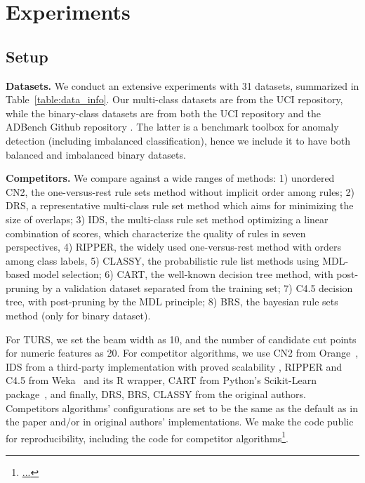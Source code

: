  
\section{Experiments} \label{sec:exp}
\subsection{Setup}
\textbf{Datasets.} We conduct an extensive experiments with 31 datasets, summarized in Table~\ref{table:data_info}. Our multi-class datasets are from the UCI repository, while the binary-class datasets are from both the UCI repository and the ADBench Github repository \citep{han2022adbench}. The latter is a benchmark toolbox for anomaly detection (including imbalanced classification), hence we include it to have both balanced and imbalanced binary datasets.

\noindent
\textbf{Competitors.} We compare against a wide ranges of methods: 1) unordered CN2, the one-versus-rest rule sets method without implicit order among rules; 2) DRS, a representative multi-class rule set method which aims for minimizing the size of overlaps; 3) IDS, the multi-class rule set method optimizing a linear combination of scores, which characterize the quality of rules in seven perspectives, 4) RIPPER, the widely used one-versus-rest method with orders among class labels, 5) CLASSY, the probabilistic rule list methods using MDL-based model selection; 6) CART, the well-known decision tree method, with post-pruning by a validation dataset separated from the training set; 7) C4.5 decision tree, with post-pruning by the MDL principle; 8) BRS, the bayesian rule sets method (only for binary dataset). 

 For TURS, we set the beam width as 10, and the number of candidate cut points for numeric features as 20. For competitor algorithms, we use CN2 from Orange~\citep{JMLR:demsar13a}, IDS from a third-party implementation with proved scalability \citep{filip2019pyids}, RIPPER and C4.5 from Weka~\citep{hall2009weka} and its R wrapper, CART from Python's Scikit-Learn package~\citep{scikit-learn}, and finally, DRS, BRS, CLASSY from the original authors. Competitors algorithms' configurations are set to be the same as the default as in the paper and/or in original authors' implementations. We make the code public for reproducibility, including the code for competitor algorithms\footnote{\url{...}}.




